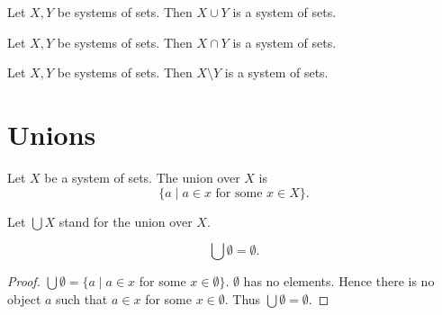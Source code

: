 \documentclass[10pt]{article}
\begin{document}
  \begin{forthel}
    \begin{proposition}
      Let $X, Y$ be systems of sets.
      Then $X \cup Y$ is a system of sets.
    \end{proposition}
  \end{forthel}

  \begin{forthel}
    \begin{proposition}
      Let $X, Y$ be systems of sets.
      Then $X \cap Y$ is a system of sets.
    \end{proposition}
  \end{forthel}

  \begin{forthel}
    \begin{proposition}
      Let $X, Y$ be systems of sets.
      Then $X \setminus Y$ is a system of sets.
    \end{proposition}
  \end{forthel}


  \section{Unions}

  \begin{forthel}
    \begin{definition}
      Let $X$ be a system of sets.
      The union over $X$ is
      \[ \{ a \mid \text{$a \in x$ for some $x \in X$} \}. \]
    \end{definition}

    Let $\bigcup X$ stand for the union over $X$.
  \end{forthel}

  \begin{forthel}
    \begin{proposition}
      \[ \bigcup \emptyset = \emptyset. \]
    \end{proposition}
    \begin{proof}
      $\bigcup \emptyset = \{ a \mid a \in x$ for some $x \in \emptyset \}$.
      $\emptyset$ has no elements.
      Hence there is no object $a$ such that $a \in x$ for some
      $x \in \emptyset$.
      Thus $\bigcup \emptyset = \emptyset$.
    \end{proof}
  \end{forthel}
\end{document}
